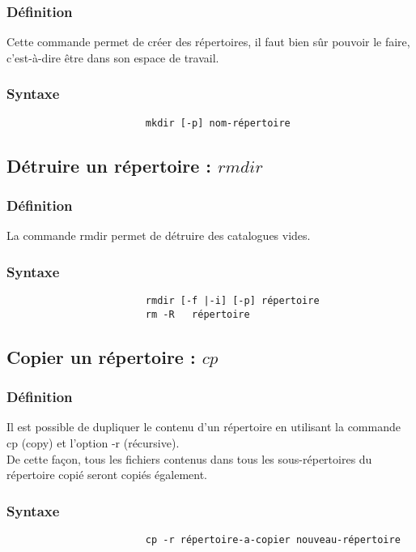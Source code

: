 				\subsubsection{Définition}
					Cette commande permet de créer des répertoires, il faut bien sûr pouvoir le faire, c'est-à-dire être dans son espace de travail.
				\subsubsection{Syntaxe}
					\begin{verbatim}
						mkdir [-p] nom-répertoire
					\end{verbatim}					

			\subsection{Détruire un répertoire : $rmdir$}
				\subsubsection{Définition}
					La commande rmdir permet de détruire des catalogues vides.
				\subsubsection{Syntaxe}
					\begin{verbatim}
						rmdir [-f |-i] [-p] répertoire
						rm -R   répertoire
					\end{verbatim}				
			\subsection{Copier un répertoire : $cp$}
				\subsubsection{Définition}
					Il est possible de dupliquer le contenu d'un répertoire en utilisant la commande cp (copy) et l'option -r (récursive).\\
					De cette façon, tous les fichiers contenus dans tous les sous-répertoires du répertoire copié seront copiés également.
				\subsubsection{Syntaxe}
					\begin{verbatim}
						cp -r répertoire-a-copier nouveau-répertoire
					\end{verbatim}		
